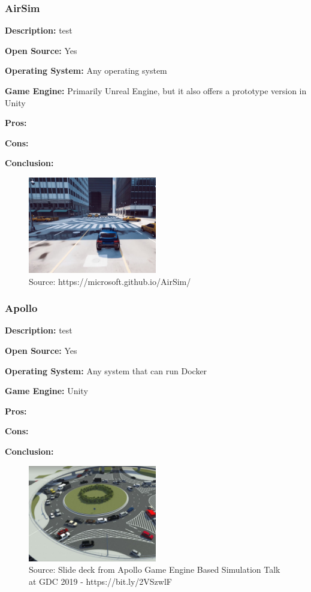 \subsubsection{AirSim}
\textbf{Description:} test

\textbf{Open Source:} Yes

\textbf{Operating System:} Any operating system

\textbf{Game Engine:} Primarily Unreal Engine, but it also offers a prototype version in Unity

\textbf{Pros:}

\textbf{Cons:}

\textbf{Conclusion:}

\begin{figure}[H]
    \centering
    \includegraphics[width=0.5\textwidth]{Simulators/AirSim.JPG}
    \caption{Source: https://microsoft.github.io/AirSim/}
\end{figure}

\subsubsection{Apollo}
\textbf{Description:} test

\textbf{Open Source:} Yes

\textbf{Operating System:} Any system that can run Docker

\textbf{Game Engine:} Unity

\textbf{Pros:}

\textbf{Cons:}

\textbf{Conclusion:}



\begin{figure}[H]
    \centering
    \includegraphics[width=0.5\textwidth]{Simulators/Apollo.JPG}
    \caption{Source: Slide deck from Apollo Game Engine Based Simulation Talk at GDC 2019 - https://bit.ly/2VSzwlF}
\end{figure}

